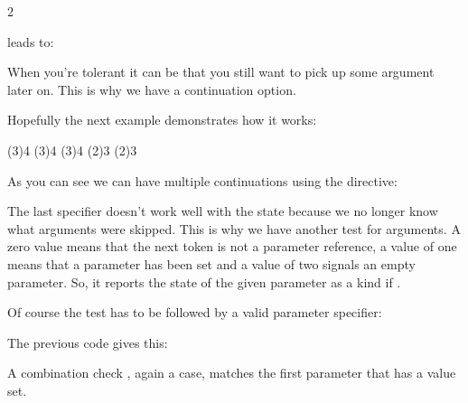 \startbuffer[example]
 {2}
\macro
\stopbuffer

\typebuffer[example][option=TEX]

leads to:

\getbuffer[example]

When you're tolerant it can be that you still want to pick up some argument
later on. This is why we have a continuation option.

\startbuffer[definition]
\tolerant{}
\tolerant{}
\tolerant{}
\stopbuffer

\typebuffer[definition][option=TEX] \getbuffer[definition]

Hopefully the next example demonstrates how it works:

\startbuffer[example]
  
  
\oof[1][2](3){4} \oof[1](3){4} \oof(3){4}
 
\ofo[1](2){3} \ofo(2){3}
\stopbuffer

\typebuffer[example][option=TEX]

As you can see we can have multiple continuations using the \type {#:} directive:

\startlines \getbuffer[example] \stoplines

The last specifier doesn't work well with the \type {\ifarguments} state because
we no longer know what arguments were skipped. This is why we have another test
for arguments. A zero value means that the next token is not a parameter
reference, a value of one means that a parameter has been set and a value of two
signals an empty parameter. So, it reports the state of the given parameter as
a kind if \type {\ifcase}.

\startbuffer[definition]
\stopbuffer

\typebuffer[definition][option=TEX] \getbuffer[definition]

\startbuffer[example]
   \foo{}{}
\stopbuffer

Of course the test has to be followed by a valid parameter specifier:

\typebuffer[example][option=TEX]

The previous code gives this:

\getbuffer[example]

A combination check \type {\ifparameters}, again a case, matches the first
parameter that has a value set.


